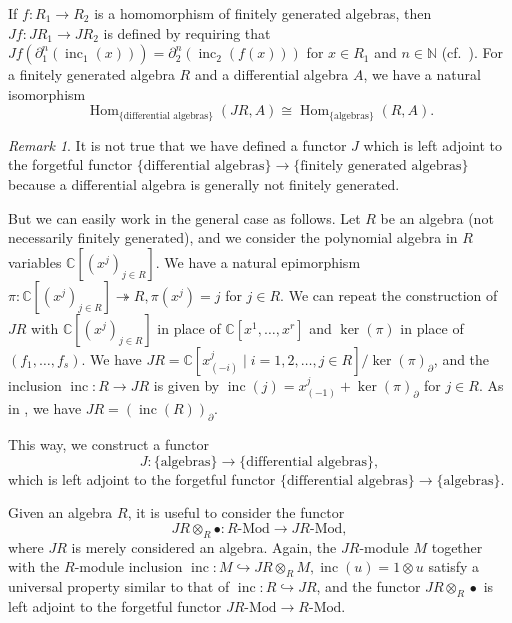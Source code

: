 \documentclass[a4paper, 12pt, reqno]{amsart}
\theoremstyle{remark}
\newtheorem{remark}[theorem]{Remark}
\DeclareMathOperator{\Hom}{Hom}
\DeclareMathOperator{\inc}{inc}
\begin{document}
If $f: R_1 \to R_2$ is a homomorphism of finitely generated algebras, then $Jf: JR_1 \to JR_2$ is defined by requiring that $Jf(\partial_1^n(\inc_1(x))) = \partial^n_2(\inc_2(f(x)))$ for $x \in R_1$ and $n \in \mathbb{N}$ (cf.\ ).
For a finitely generated algebra $R$ and a differential algebra $A$, we have a natural isomorphism
\begin{equation*}
  \Hom_{\{\text{differential algebras}\}}(JR, A) \cong \Hom_{\{\text{algebras}\}}(R, A).
\end{equation*}

\begin{remark}
  \label{rmk:55}
  It is not true that we have defined a functor $J$ which is left adjoint to the forgetful functor $\{\text{differential algebras}\} \to \{\text{finitely generated algebras}\}$ because a differential algebra is generally not finitely generated.

  But we can easily work in the general case as follows.
  Let $R$ be an algebra (not necessarily finitely generated), and we consider the polynomial algebra in $R$ variables $\mathbb{C}[(x^j)_{j \in R}]$.
  We have a natural epimorphism $\pi: \mathbb{C}[(x^j)_{j \in R}] \twoheadrightarrow R, \pi(x^j) = j$ for $j \in R$.
  We can repeat the construction of $JR$ with $\mathbb{C}[(x^j)_{j \in R}]$ in place of $\mathbb{C}[x^1, \dots, x^r]$ and $\ker(\pi)$ in place of $(f_1, \dots, f_s)$.
  We have $JR = \mathbb{C}[x^j_{(-i)} \mid i = 1, 2, \dots, j \in R]/\ker(\pi)_{\partial}$, and the inclusion $\inc: R \to JR$ is given by $\inc(j) = x^j_{(-1)} + \ker(\pi)_{\partial}$ for $j \in R$.
  As in , we have $JR = (\inc(R))_{\partial}$.

  This way, we construct a functor
  \begin{equation*}
    J: \{\text{algebras}\} \to \{\text{differential algebras}\},
  \end{equation*}
  which is left adjoint to the forgetful functor $\{\text{differential algebras}\} \to \{\text{algebras}\}$.
\end{remark}

Given an algebra $R$, it is useful to consider the functor
\begin{equation*}
  JR \otimes_R \bullet: \text{$R$-Mod} \to \text{$JR$-Mod},
\end{equation*}
where $JR$ is merely considered an algebra.
Again, the $JR$-module $M$ together with the $R$-module inclusion $\inc: M \hookrightarrow JR \otimes_R M, \inc(u) = 1\otimes u$ satisfy a universal property similar to that of $\inc: R \hookrightarrow JR$, and the functor $JR \otimes_R \bullet$ is left adjoint to the forgetful functor $\text{$JR$-Mod} \to \text{$R$-Mod}$.
\end{document}
